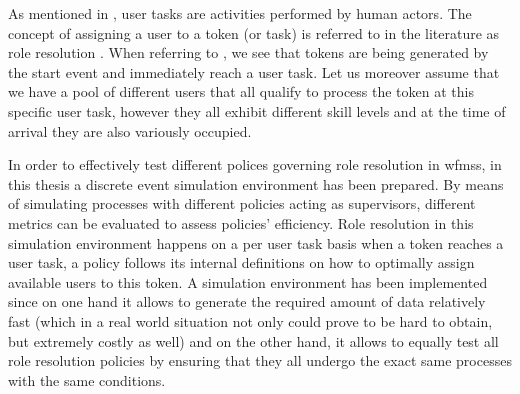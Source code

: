 As mentioned in , user tasks are activities performed by human actors. The concept of assigning a user to a token (or task) is referred to in the literature as role resolution \citep{Zeng2005,Cheng2000}. When referring to , we see that tokens are being generated by the start event and immediately reach a user task. Let us moreover assume that we have a pool of different users that all qualify to process the token at this specific user task, however they all exhibit different skill levels and at the time of arrival they are also variously occupied. 


In order to effectively test different polices governing role resolution in \glspl{wfms}, in this thesis a discrete event simulation environment has been prepared. By means of simulating processes with different policies acting as supervisors, different metrics can be evaluated to assess policies' efficiency. Role resolution in this simulation environment happens on a per user task basis \ie when a token reaches a user task, a policy follows its internal definitions on how to optimally assign available users to this token. A simulation environment has been implemented since on one hand it allows to generate the required amount of data relatively fast (which in a real world situation not only could prove to be hard to obtain, but extremely costly as well) and on the other hand, it allows to equally test all role resolution policies by ensuring that they all undergo the exact same processes with the same conditions.